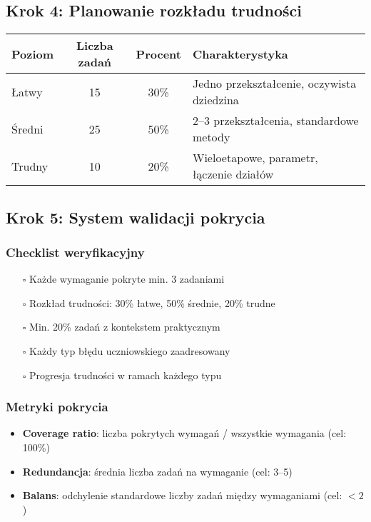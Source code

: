 \documentclass[12pt,a4paper]{article}
\begin{document}
\subsection{Krok 4: Planowanie rozkładu trudności}

\begin{table}[h]
\centering
\begin{tabular}{|l|c|c|l|}
\hline
\textbf{Poziom} & \textbf{Liczba zadań} & \textbf{Procent} & \textbf{Charakterystyka} \\
\hline
Łatwy & 15 & 30\% & Jedno przekształcenie, oczywista dziedzina \\
Średni & 25 & 50\% & 2--3 przekształcenia, standardowe metody \\
Trudny & 10 & 20\% & Wieloetapowe, parametr, łączenie działów \\
\hline
\end{tabular}
\end{table}

\subsection{Krok 5: System walidacji pokrycia}

\subsubsection{Checklist weryfikacyjny}
\begin{itemize}
    \item[$\square$] Każde wymaganie pokryte min. 3 zadaniami
    \item[$\square$] Rozkład trudności: 30\% łatwe, 50\% średnie, 20\% trudne
    \item[$\square$] Min. 20\% zadań z kontekstem praktycznym
    \item[$\square$] Każdy typ błędu uczniowskiego zaadresowany
    \item[$\square$] Progresja trudności w ramach każdego typu
\end{itemize}

\subsubsection{Metryki pokrycia}
\begin{itemize}
    \item \textbf{Coverage ratio}: liczba pokrytych wymagań / wszystkie wymagania (cel: 100\%)
    \item \textbf{Redundancja}: średnia liczba zadań na wymaganie (cel: 3--5)
    \item \textbf{Balans}: odchylenie standardowe liczby zadań między wymaganiami (cel: $<2$)
\end{itemize}
\end{document}
